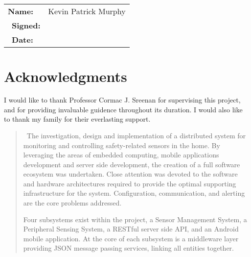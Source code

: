 \documentclass{article}
\newcommand{\meiumsize}{\fontsize{16pt}{20pt}\selectfont}
\begin{document}
\begin{table}[H]
\def\arraystretch{2}%
 \begin{tabular}{ R{5cm} c } 

 {\meiumsize \textbf{Name:}} & {\meiumsize Kevin Patrick Murphy}
 \\\
 {\meiumsize \textbf{Signed:}} & {\meiumsize } 
 \\\
 {\meiumsize \textbf{Date:}} & {\meiumsize }
 
\end{tabular}
\end{table}

\newpage
\section*{Acknowledgments}
I would like to thank Professor Cormac J. Sreenan for supervising this project, and for providing invaluable guidence throughout its duration. I would also like to thank my family for their everlasting support. 


\newpage
\begin{abstract}

{\ The investigation, design and implementation of a distributed system for monitoring and controlling safety-related sensors in the home. By leveraging the areas of embedded computing, mobile applications development and server side development, the creation of a full software ecosystem was undertaken. Close attention was devoted to the software and hardware architectures required to provide the optimal supporting infrastructure for the system. Configuration, communication, and alerting are the core problems addressed.

Four subsystems exist within the project, a Sensor Management System, a Peripheral Sensing System, a RESTful server side API, and an Android mobile application. At the core of each subsystem is a middleware layer providing JSON message passing services, linking all entities together. }

\end{abstract}

\newpage

\tableofcontents

\newpage
\end{document}
